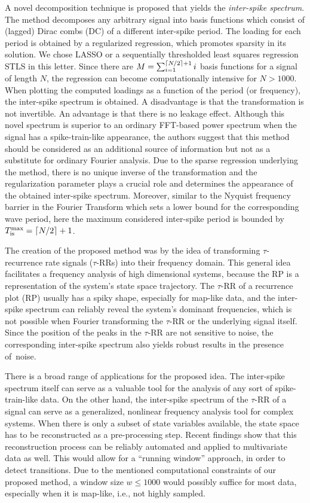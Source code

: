 \documentclass[entropy,article,accept,pdftex,moreauthors]{Definitions/mdpi}
\DeclarePairedDelimiter\ceil{\lceil}{\rceil}
\begin{document}
A novel decomposition technique is proposed that yields the \textit{inter-spike spectrum}. The method decomposes any arbitrary signal into basis functions which consist of (lagged) Dirac 
combs (DC) of a different inter-spike period. The loading for each period is obtained by a regularized regression, which promotes sparsity in its solution. We chose LASSO or a sequentially 
thresholded least squares regression STLS in this letter. Since there are 
$M = \sum_{i=1}^{\ceil*{N/2}+1}i$ basis functions for a signal of length $N$, the regression can become computationally intensive for $N>1000$. When plotting the computed loadings as a function 
of the period (or frequency), the inter-spike spectrum is obtained. A disadvantage is that the transformation is not invertible. An advantage is that there is no leakage effect.
Although this novel spectrum is superior to an ordinary FFT-based power spectrum when the signal has a spike-train-like appearance, the authors suggest that this method should 
be considered 
as an additional source of information but not as a substitute for ordinary Fourier analysis. 
Due to the sparse regression underlying the method, there is no unique inverse of the transformation and the regularization parameter plays a crucial role and determines the 
appearance of the obtained inter-spike spectrum. Moreover, similar to the Nyquist frequency barrier in the Fourier Transform which sets a lower bound for the corresponding wave period, here 
the maximum considered inter-spike period is bounded by $T_{\text{is}}^{\text{max}} = \ceil*{N/2}+1$.

The creation of the proposed method was by the idea of transforming $\tau$-recurrence rate signals ($\tau$-RRs) into their frequency domain. 
This general idea \cite{Zbilut2008} facilitates a frequency analysis of high dimensional systems, because the RP is a representation of the system's state space trajectory.   
The $\tau$-RR of a recurrence plot (RP) usually has a spiky shape, especially for map-like data, and the inter-spike spectrum can reliably reveal the system's dominant frequencies, 
which is not possible when Fourier transforming the $\tau$-RR or the underlying signal itself. Since the position of the peaks 
in the $\tau$-RR are not sensitive to noise, the corresponding inter-spike spectrum also yields robust results in the presence of~noise. 

There is a broad range of applications for the proposed idea. The inter-spike spectrum itself can serve as a valuable tool for the analysis of any sort of 
spike-train-like data. On the other hand, the inter-spike spectrum of the $\tau$-RR of a signal can serve as a generalized, nonlinear frequency analysis tool for complex systems. 
When there is only a subset of state variables available, the state space has to be reconstructed as a pre-processing step. Recent findings \cite{Kraemer2021,Kraemer2022} show that 
this reconstruction process can be reliably automated and applied to multivariate data as well. This would allow for a ``running window'' approach, in order to detect transitions. 
Due to the mentioned computational constraints of our proposed method, a window size $w\leq 1000$ would possibly suffice for most data, especially when it is map-like, i.e., not 
highly sampled. 
\end{document}
